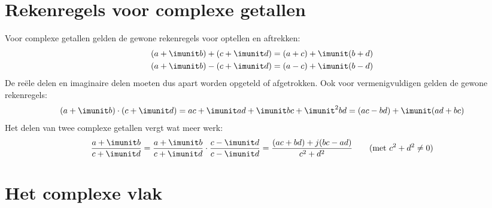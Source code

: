 \section{Rekenregels voor complexe getallen}
Voor complexe getallen gelden de gewone rekenregels voor optellen en aftrekken:
%
\begin{equation}
\begin{split}
(a + \imunit b) + (c + \imunit d) &= (a + c) + \imunit(b + d) \\
(a + \imunit b) - (c + \imunit d) &= (a - c) + \imunit(b - d) \\
\end{split}
\end{equation}
%
De reële delen en imaginaire delen moeten dus apart worden opgeteld of afgetrokken. Ook voor vermenigvuldigen gelden de gewone rekenregels:
%
\begin{equation}
(a + \imunit b) \cdot (c + \imunit d) = ac + \imunit ad + \imunit bc + \imunit^2 bd = (ac - bd) + \imunit(ad + bc)
\end{equation}
%
Het delen van twee complexe getallen vergt wat meer werk:
%
\begin{equation}
\dfrac{a+\imunit b}{c+\imunit d} = \dfrac{a+\imunit b}{c+\imunit d}\cdot\dfrac{c-\imunit d}{c-\imunit d} = \dfrac{(ac+bd)+j(bc-ad)}{c^2+d^2} \qquad(\text{met } c^2+d^2 \neq 0)
\end{equation}


\section{Het complexe vlak}

